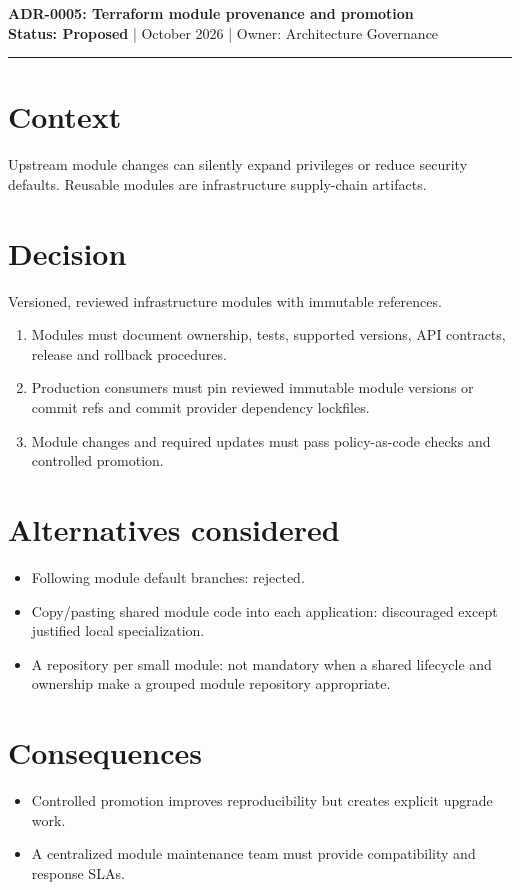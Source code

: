 \documentclass[11pt]{article}
\begin{document}
\begin{center}
{\LARGE\bfseries\color{Navy} ADR-0005: Terraform module provenance and promotion }\\[4mm]
\textbf{Status: Proposed} \quad |  October 2026 \quad | \quad Owner: Architecture Governance
\end{center}
\hrule
\section*{Context}
Upstream module changes can silently expand privileges or reduce security defaults. Reusable modules are infrastructure supply-chain artifacts.
\section*{Decision}
Versioned, reviewed infrastructure modules with immutable references.
\begin{enumerate}[leftmargin=*]
\item Modules must document ownership, tests, supported versions, API contracts, release and rollback procedures.
\item Production consumers must pin reviewed immutable module versions or commit refs and commit provider dependency lockfiles.
\item Module changes and required updates must pass policy-as-code checks and controlled promotion.
\end{enumerate}
\section*{Alternatives considered}
\begin{itemize}[leftmargin=*]
\item Following module default branches: rejected.
\item Copy/pasting shared module code into each application: discouraged except justified local specialization.
\item A repository per small module: not mandatory when a shared lifecycle and ownership make a grouped module repository appropriate.
\end{itemize}
\section*{Consequences}
\begin{itemize}[leftmargin=*]
\item Controlled promotion improves reproducibility but creates explicit upgrade work.
\item A centralized module maintenance team must provide compatibility and response SLAs.
\end{itemize}
\end{document}
